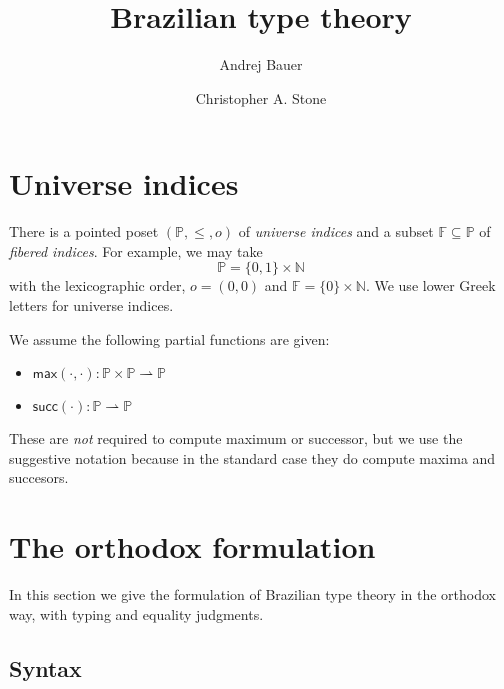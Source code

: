 \documentclass{article}
\newcommand{\NN}{\mathbb{N}} %
\newcommand{\PP}{\mathbb{P}} %
\newcommand{\FF}{\mathbb{F}} %
\newcommand{\zero}{o} %
\newcommand{\piClose}[2]{\mathsf{max}(#1,#2)}   %
\newcommand{\uClose}[1]{\mathsf{succ}(#1)}  %
\begin{document}
\title{Brazilian type theory}
\author{Andrej Bauer \and Christopher A. Stone}
\maketitle

\section{Universe indices}
\label{sec:universe-indices}

There is a pointed poset $(\PP, {\leq}, \zero)$ of \emph{universe
  indices} and a subset $\FF \subseteq \PP$ of \emph{fibered indices}.
For example, we may take
%
\begin{equation*}
  \PP = \{0,1\} \times \NN
\end{equation*}
%
with the lexicographic order, $\zero = (0,0)$ and $\FF = \{0\} \times
\NN$. We use lower Greek letters for universe indices.

We assume the following partial functions are given:
\begin{itemize}
  \item $\piClose{\cdot}{\cdot} : \PP \times \PP \rightharpoonup \PP$
  \item $\uClose{\cdot}  : \PP \rightharpoonup \PP$
\end{itemize}
%
These are \emph{not} required to compute maximum or successor, but we use the suggestive
notation because in the standard case they do compute maxima and succesors.

\section{The orthodox formulation}
\label{sec:orthodox-formulation}

In this section we give the formulation of Brazilian type theory in the orthodox way, with
typing and equality judgments.

\subsection{Syntax}
\label{sec:syntax}
\end{document}
